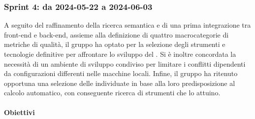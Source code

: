 \subsubsection{Sprint 4: da 2024-05-22 a 2024-06-03}
A seguito del raffinamento della ricerca semantica e di una prima integrazione tra
front-end e back-end, assieme alla definizione di quattro macrocategorie di metriche
di qualità, il gruppo ha optato per la selezione degli strumenti e tecnologie definitive per affrontare lo sviluppo del .
Si è inoltre concordata la necessità di un ambiente di sviluppo condiviso per limitare i conflitti dipendenti da configurazioni differenti nelle macchine locali. Infine, il gruppo ha ritenuto opportuna una selezione delle  individuate in base alla loro predisposizione al calcolo automatico, con conseguente ricerca di strumenti che lo attuino.

\paragraph{Obiettivi}

\vspace{0.5\baselineskip}
\par [Inserire Gantt]